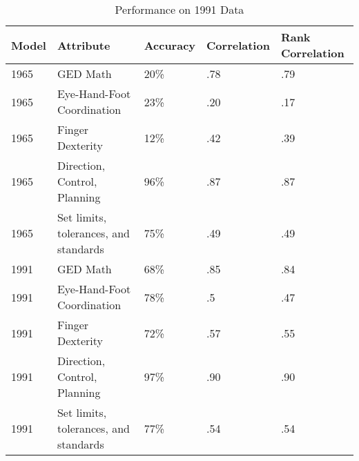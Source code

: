 \documentclass[11pt]{article}
\begin{document}
\begin{table}[h]
  \caption{Performance on 1991 Data}
\begin{tabular}{|l|l|l|l|l|}
\hline
\textbf{Model} & \textbf{Attribute}                    & \textbf{Accuracy} & \textbf{Correlation} & \textbf{Rank Correlation} \\ \hline
1965           & GED Math                              & 20\%              & .78                  & .79                       \\ \hline
1965           & Eye-Hand-Foot Coordination            & 23\%              & .20                  & .17                       \\ \hline
1965           & Finger Dexterity                      & 12\%              & .42                  & .39                       \\ \hline
1965           & Direction, Control, Planning          & 96\%              & .87                  & .87                       \\ \hline
1965           & Set limits, tolerances, and standards & 75\%              & .49                  & .49                       \\ \hline
1991           & GED Math                              & 68\%              & .85                  & .84                       \\ \hline
1991           & Eye-Hand-Foot Coordination            & 78\%              & .5                   & .47                       \\ \hline
1991           & Finger Dexterity                      & 72\%              & .57                  & .55                       \\ \hline
1991           & Direction, Control, Planning          & 97\%              & .90                  & .90                       \\ \hline
1991           & Set limits, tolerances, and standards & 77\%              & .54                  & .54                       \\ \hline
\end{tabular}
\end{table}
\end{document}
